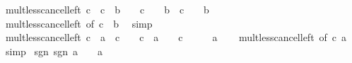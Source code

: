 \begin{isabellebody}
\isanewline
{}\isamarkupfalse%
\ mult{\isacharunderscore}{\kern0pt}less{\isacharunderscore}{\kern0pt}cancel{\isacharunderscore}{\kern0pt}left{}{\isacharcolon}{\kern0pt}\ {\isachardoublequoteopen}c\ {\isacharless}{\kern0pt}\ c\ {\isacharasterisk}{\kern0pt}\ b\ {\isasymlongleftrightarrow}\ {\isacharparenleft}{\kern0pt}{}\ {\isasymle}\ c\ {\isasymlongrightarrow}\ {}\ {\isacharless}{\kern0pt}\ b{\isacharparenright}{\kern0pt}\ {\isasymand}\ {\isacharparenleft}{\kern0pt}c\ {\isasymle}\ {}\ {\isasymlongrightarrow}\ b\ {\isacharless}{\kern0pt}\ {}{\isacharparenright}{\kern0pt}{\isachardoublequoteclose}\isanewline
%
\isadelimproof
\ \ %
\endisadelimproof
%
\isatagproof
{}\isamarkupfalse%
\ mult{\isacharunderscore}{\kern0pt}less{\isacharunderscore}{\kern0pt}cancel{\isacharunderscore}{\kern0pt}left\ {\isacharbrackleft}{\kern0pt}of\ c\ {}\ b{\isacharbrackright}{\kern0pt}\ \isamarkupfalse%
\ simp%
\endisatagproof
{\isafoldproof}%
%
\isadelimproof
\isanewline
%
\endisadelimproof
\isanewline
{}\isamarkupfalse%
\ mult{\isacharunderscore}{\kern0pt}less{\isacharunderscore}{\kern0pt}cancel{\isacharunderscore}{\kern0pt}left{}{\isacharcolon}{\kern0pt}\ {\isachardoublequoteopen}c\ {\isacharasterisk}{\kern0pt}\ a\ {\isacharless}{\kern0pt}\ c\ {\isasymlongleftrightarrow}\ {\isacharparenleft}{\kern0pt}{}\ {\isasymle}\ c\ {\isasymlongrightarrow}\ a\ {\isacharless}{\kern0pt}\ {}{\isacharparenright}{\kern0pt}\ {\isasymand}\ {\isacharparenleft}{\kern0pt}c\ {\isasymle}\ {}\ {\isasymlongrightarrow}\ {}\ {\isacharless}{\kern0pt}\ a{\isacharparenright}{\kern0pt}{\isachardoublequoteclose}\isanewline
%
\isadelimproof
\ \ %
\endisadelimproof
%
\isatagproof
{}\isamarkupfalse%
\ mult{\isacharunderscore}{\kern0pt}less{\isacharunderscore}{\kern0pt}cancel{\isacharunderscore}{\kern0pt}left\ {\isacharbrackleft}{\kern0pt}of\ c\ a\ {}{\isacharbrackright}{\kern0pt}\ \isamarkupfalse%
\ simp%
\endisatagproof
{\isafoldproof}%
%
\isadelimproof
\isanewline
%
\endisadelimproof
\isanewline
{}\isamarkupfalse%
\ sgn{\isacharunderscore}{\kern0pt}{}{\isacharunderscore}{\kern0pt}{}{\isacharcolon}{\kern0pt}\ {\isachardoublequoteopen}sgn\ a\ {\isacharequal}{\kern0pt}\ {}\ {\isasymlongleftrightarrow}\ a\ {\isacharequal}{\kern0pt}\ {}{\isachardoublequoteclose}\isanewline
%
\isadelimproof
\ \ %
\endisadelimproof
%
\isatagproof

\end{isabellebody}
